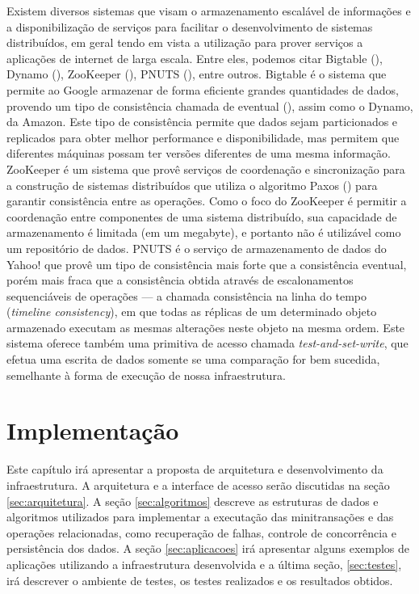 \documentclass[11pt,twoside,a4paper]{book}
\begin{document}
Existem diversos sistemas que visam o armazenamento escalável de informações e a disponibilização de serviços para facilitar o desenvolvimento de sistemas distribuídos, em geral tendo em vista a utilização para prover serviços a aplicações de internet de larga escala. Entre eles, podemos citar Bigtable (\cite{bigtable}), Dynamo (\cite{dynamo}), ZooKeeper (\cite{zookeeper}), PNUTS (\cite{pnuts}), entre outros. Bigtable é o sistema que permite ao Google armazenar de forma eficiente grandes quantidades de dados, provendo um tipo de consistência chamada de eventual (\cite{eventual_consistency}), assim como o Dynamo, da Amazon. Este tipo de consistência permite que dados sejam particionados e replicados para obter melhor performance e disponibilidade, mas permitem que diferentes máquinas possam ter versões diferentes de uma mesma informação. ZooKeeper é um sistema que provê serviços de coordenação e sincronização para a construção de sistemas distribuídos que utiliza o algoritmo Paxos (\cite{paxos}) para garantir consistência entre as operações. Como o foco do ZooKeeper é permitir a coordenação entre componentes de uma sistema distribuído, sua capacidade de armazenamento é limitada (em um megabyte), e portanto não é utilizável como um repositório de dados. PNUTS é o serviço de armazenamento de dados do Yahoo! que provê um tipo de consistência mais forte que a consistência eventual, porém mais fraca que a consistência obtida através de escalonamentos sequenciáveis de operações --- a chamada consistência na linha do tempo (\emph{timeline consistency}), em que todas as réplicas de um determinado objeto armazenado executam as mesmas alterações neste objeto na mesma ordem. Este sistema oferece também uma primitiva de acesso chamada \emph{test-and-set-write}, que efetua uma escrita de dados somente se uma comparação for bem sucedida, semelhante à forma de execução de nossa infraestrutura.

\chapter{Implementação}
\label{chap:implementacao}
Este capítulo irá apresentar a proposta de arquitetura e desenvolvimento da infraestrutura. A arquitetura e a interface de acesso serão discutidas na seção \ref{sec:arquitetura}. A seção \ref{sec:algoritmos} descreve as estruturas de dados e algoritmos utilizados para implementar a executação das minitransações e das operações relacionadas, como recuperação de falhas, controle de concorrência e persistência dos dados. A seção \ref{sec:aplicacoes} irá apresentar alguns exemplos de aplicações utilizando a infraestrutura desenvolvida e a última seção, \ref{sec:testes}, irá descrever o ambiente de testes, os testes realizados e os resultados obtidos.
\end{document}
